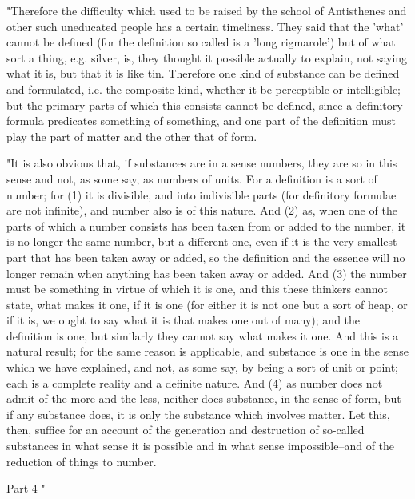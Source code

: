 "Therefore the difficulty which used to be raised by the school of
Antisthenes and other such uneducated people has a certain timeliness.
They said that the 'what' cannot be defined (for the definition so
called is a 'long rigmarole') but of what sort a thing, e.g. silver,
is, they thought it possible actually to explain, not saying what
it is, but that it is like tin. Therefore one kind of substance can
be defined and formulated, i.e. the composite kind, whether it be
perceptible or intelligible; but the primary parts of which this consists
cannot be defined, since a definitory formula predicates something
of something, and one part of the definition must play the part of
matter and the other that of form. 

"It is also obvious that, if substances are in a sense numbers, they
are so in this sense and not, as some say, as numbers of units. For
a definition is a sort of number; for (1) it is divisible, and into
indivisible parts (for definitory formulae are not infinite), and
number also is of this nature. And (2) as, when one of the parts of
which a number consists has been taken from or added to the number,
it is no longer the same number, but a different one, even if it is
the very smallest part that has been taken away or added, so the definition
and the essence will no longer remain when anything has been taken
away or added. And (3) the number must be something in virtue of which
it is one, and this these thinkers cannot state, what makes it one,
if it is one (for either it is not one but a sort of heap, or if it
is, we ought to say what it is that makes one out of many); and the
definition is one, but similarly they cannot say what makes it one.
And this is a natural result; for the same reason is applicable, and
substance is one in the sense which we have explained, and not, as
some say, by being a sort of unit or point; each is a complete reality
and a definite nature. And (4) as number does not admit of the more
and the less, neither does substance, in the sense of form, but if
any substance does, it is only the substance which involves matter.
Let this, then, suffice for an account of the generation and destruction
of so-called substances in what sense it is possible and in what sense
impossible--and of the reduction of things to number. 

Part 4 "

